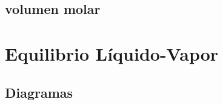 \documentclass[12pt,letterpaper ,oneside , openright]{book}
\begin{document}
      
	\tableofcontents	

			\subsection{volumen molar}\label{subsec:volume}
			




		
			
		
		
		
		
		\section{Equilibrio Líquido-Vapor}\label{sec:heterogeneous}
		
		
		
		
		
		

		\subsection{Diagramas}
	



	
	
	
		
	
	
	\appendix
	
	
	
	
	

	
	  
\end{document}
